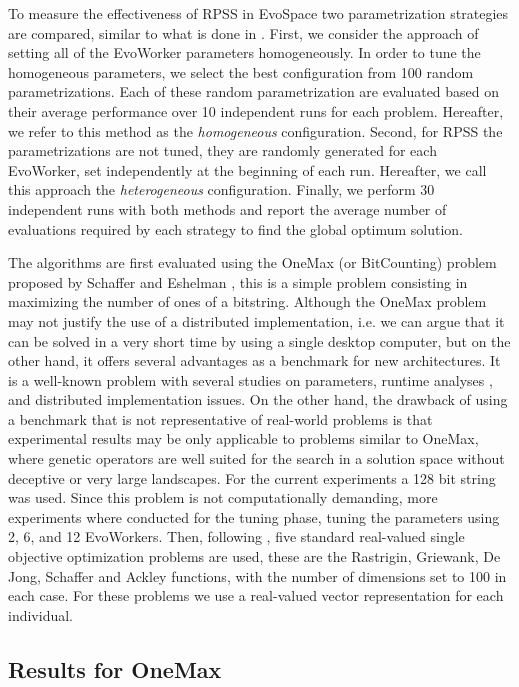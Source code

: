 \documentclass[graybox]{svmult}
\begin{document}
To measure the effectiveness of RPSS in EvoSpace two parametrization strategies are compared,
similar to what is done in \cite{fuku1,fuku2,garcia2014randomized}. First, we consider the approach of setting all
of the EvoWorker parameters homogeneously. In order to tune the homogeneous parameters,
we select the best configuration from 100 random parametrizations.
Each of these random parametrization are evaluated based on their average performance over 10
independent runs for each problem.
Hereafter, we refer to this method as the {\em homogeneous} configuration.
Second, for RPSS the parametrizations
are not tuned, they are randomly generated for each EvoWorker, set independently at the beginning of each run.
Hereafter, we call this approach the {\em heterogeneous} configuration. Finally, we perform 30 independent runs
with both methods and report the average number of evaluations required by each strategy to find the
global optimum solution.

The algorithms are first evaluated using the OneMax (or BitCounting) problem proposed by
Schaffer and Eshelman \cite{SE91}, this is a simple problem consisting in maximizing the number
of ones of a bitstring. Although the OneMax problem may not justify the use of a distributed
implementation, i.e. we can argue that it can be solved in a very short time by using a
single desktop computer, but on the other hand, it offers several advantages as a
benchmark for new architectures. It is a well-known problem with several
studies on parameters,  runtime analyses \cite{DBLP:journals/corr/MereloGVB15},
and distributed implementation
issues. On the other hand, the drawback of using a benchmark that is not representative of
real-world problems is that experimental results may be only applicable to
problems similar to OneMax, where genetic operators are well suited for the
search in a solution space without deceptive or very large landscapes.
For the current experiments a 128 bit string was used. Since this
problem is not computationally demanding, more experiments where conducted for the tuning phase,
tuning the parameters using 2, 6, and 12 EvoWorkers. Then, following \cite{fuku1},
five standard real-valued single objective optimization problems
are used, these are the Rastrigin, Griewank, De Jong, Schaffer  and Ackley functions,
with the number of dimensions set to 100 in each case. For these problems we use a real-valued vector
representation for each individual.

\subsection{Results for OneMax}
\end{document}
